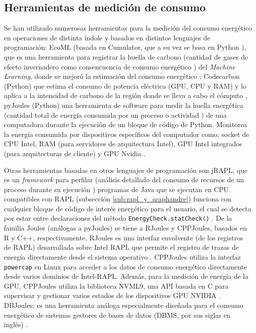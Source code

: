 \documentclass[12pt, letter paper]{report}
\begin{document}
      \subsection{Herramientas de medición de consumo} %
      \label{sub:herramientas_de_medición_de_consumo}
        Se han utilizado numerosas herramientas para la medición del consumo
        energético en operaciones de distinta índole y basados en distintos
        lenguajes de programación: EcoML (basada en Cumulator, que a su vez se
        basa en Python \cite{trebaolcumulator2020}), que es una herramienta para
        registrar la huella de carbono (cantidad de gases de efecto invernadero
        como consencuencia de consumo energético \cite{baldwin2006carbon}) del
        \textit{Machine Learning}, donde se mejoró la estimación del consumo
        energético \cite{igescuecoml2023}; Codecarbon (Python) que estima el
        consumo de potencia eléctrica (GPU, CPU y RAM) y lo aplica a la
        intensidad de carbono de la región donde se lleva a cabo el cómputo
        \cite{mlco2mlco2codecarbon2025}, pyJoules (Python) una herramienta de
        software para medir la huella energética (cantidad total de energía
        consumida por un proceso o actividad \cite{pan2024energy}) de una
        computadora durante la ejecución de un bloque de código de Python.
        Monitorea la energía consumida por dispositivos específicos del
        computador como: socket de CPU Intel, RAM (para servidores de
        arquitectura Intel), GPU Intel integrados (para arquitecturas de
        cliente) y GPU Nvidia \cite{belgaidpyjoules2019}.

        Otras herramientas basadas en otros lenguajes de programación son jRAPL,
        que es un \textit{framework} para perfilar (análisis detallado del
        consumo de recursos de un proceso durante su ejecución
        \cite{pinto2017comprehensive}) programas de Java que se ejecutan en CPU
        compatibles con RAPL (subsección \ref{sub:rapl_y_scaphandre}) funciona
        con cualquier bloque de código de interés energético para el usuario, el
        cual se detecta por estar entre declaraciones del método
        \texttt{EnergyCheck.statCheck()} \cite{kliu20kliu20jrapl2014}. De la
        familia Joules (análogas a pyJoules) se tiene a RJoules y CPPJoules,
        basados en R y C++, respectivamente. RJoules es una interfaz envolvente
        (de los registros de RAPL) desarrollada sobre Intel RAPL que permite el
        registro de trazas de energía directamente desde el sistema operativo
        \cite{chattarajrjoules2023}. CPPJoules utiliza la interfaz
        \texttt{powercap} en Linux para acceder a los datos de consumo
        energético directamente desde varios dominios de Intel-RAPL. Además,
        para la medición de energía de la GPU, CPPJoules utiliza la biblioteca
        NVML9, una API basada en C para supervisar y gestionar varios estados de
        los dispositivos GPU NVIDIA \cite{scppjoules2024}. DBJoules: es una
        herramienta análoga especialmente diseñada para el consumo energético de
        sistemas gestores de bases de datos (DBMS, por sus siglas en inglés)
        \cite{lelladbjoules2023}.
\end{document}
